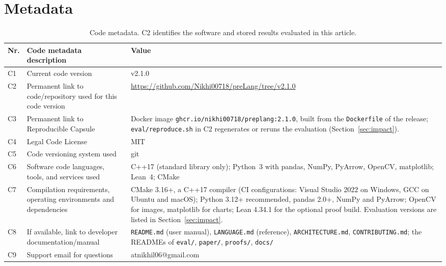 \documentclass[preprint,12pt,a4paper]{elsarticle}  %
\begin{document}
\section*{Metadata}
\begin{table}[!h]
\footnotesize
\renewcommand{\arraystretch}{1.0}
\begin{tabular}{|p{0.65cm}|>{\raggedright\arraybackslash}p{3.2cm}|>{\raggedright\arraybackslash}p{7.85cm}|}
\hline
\textbf{Nr.} & \textbf{Code metadata description} & \textbf{Value} \\
\hline
C1 & Current code version & v2.1.0 \\
\hline
C2 & Permanent link to code/repository used for this code version &
  \url{https://github.com/Nikhi00718/preLang/tree/v2.1.0} \\
\hline
C3 & Permanent link to Reproducible Capsule & Docker image \texttt{ghcr.io/nikhi00718/preplang:2.1.0}, built
  from the \texttt{Dockerfile} of the release; \texttt{eval/reproduce.sh} in C2 regenerates or reruns the
  evaluation (Section~\ref{sec:impact}). \\
\hline
C4 & Legal Code License & MIT \\
\hline
C5 & Code versioning system used & git \\
\hline
C6 & Software code languages, tools, and services used & C++17 (standard library only); Python~3 with
  pandas, NumPy, PyArrow, OpenCV, matplotlib; Lean~4; CMake \\
\hline
C7 & Compilation requirements, operating environments and dependencies & CMake 3.16+, a C++17 compiler
  (CI configurations: Visual Studio 2022 on Windows, GCC on Ubuntu and macOS); Python 3.12+ recommended,
  pandas 2.0+, NumPy and PyArrow; OpenCV for images, matplotlib for charts; Lean 4.34.1 for the optional
  proof build. Evaluation versions are listed in Section~\ref{sec:impact}. \\
\hline
C8 & If available, link to developer documentation/manual & \texttt{README.md} (user manual),
  \texttt{LANGUAGE.md} (reference), \texttt{ARCHITECTURE.md}, \texttt{CONTRIBUTING.md}; the READMEs of \texttt{eval/}, \texttt{paper/},
  \texttt{proofs/}, \texttt{docs/} \\
\hline
C9 & Support email for questions & atnikhil06@gmail.com \\
\hline
\end{tabular}
\caption{Code metadata. C2 identifies the software and stored results evaluated in this article.}
\label{tab:metadata}
\end{table}
\end{document}
